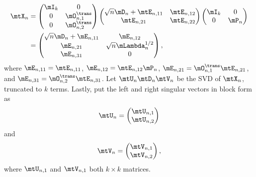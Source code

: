\begin{align}
    \mtX_n
        &=
            \left(
            \begin{matrix}
                \mI_k & 0 \\
                0  & \mO_{n,1}^\trans \\
                0  & \mO_{n,2}^\trans
            \end{matrix}
            \right)
            \left(
            \begin{matrix}
                \sqrt{n} \mD_n + \mtE_{n,11} & \mtE_{n,12} \\
                \mtE_{n,21}                  & \mtE_{n,22}
            \end{matrix}
            \right)
            \left(
            \begin{matrix}
                \mI_k & 0 \\
                0     & \mP_n
            \end{matrix}
            \right) \notag \\
        &=
            \left(
            \begin{matrix}
                \sqrt{n} \mD_n + \mE_{n,11} & \mE_{n,12} \\
                \mE_{n,21}                  & \sqrt{n} \mLambda^{1/2}_n \\
                \mE_{n,31}                  & 0
            \end{matrix}
            \right),
\end{align}
where 
$\mE_{n,11} = \mtE_{n,11}$, 
$\mE_{n,12} = \mtE_{n,12} \mP_n$,
$\mE_{n,21} = \mO_{n,1}^\trans \mtE_{n,21}$, and
$\mE_{n,31} = \mO_{n,2}^\trans \mtE_{n,31}$.
Let
\(
    \mtU_n \mtD_n \mtV_n
\)
be the SVD of $\mtX_n$, truncated to $k$ terms.  Lastly, put the left and right singular vectors in block form as
\begin{equation}
    \mtU_n
    =
    \left(
    \begin{matrix}
        \mtU_{n,1} \\
        \mtU_{n,2}
    \end{matrix}
    \right)
\end{equation}
and
\begin{equation}
    \mtV_n
    =
    \left(
    \begin{matrix}
        \mtV_{n,1} \\
        \mtV_{n,2}
    \end{matrix}
    \right),
\end{equation}
where $\mtU_{n,1}$ and $\mtV_{n,1}$ both $k\times k$ matrices.

